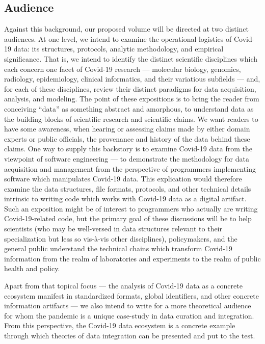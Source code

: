 \documentclass{statsoc}
\newcommand{\p}[1]{

\vspace{.75em}#1}
\newcommand{\textscc}[1]{{\color{orr!35!black}{{%
						\fontfamily{Cabin-TLF}\fontseries{b}\selectfont{\textsc{\scriptsize{#1}}}}}}}
\newcommand{\AcronymText}[1]{{\textscc{#1}}}
\newcommand{\q}[1]{{\fontfamily{qcr}\selectfont ``}#1{\fontfamily{qcr}\selectfont ''}}
\newcommand{\API}{\resizebox{!}{7pt}{\AcronymText{API}}}
\newcommand{\visavis}{vis-\`a-vis}
\begin{document}
\subsection{Audience}
\p{Against this background, our proposed volume 
will be directed at two distinct audiences.  
At one level, we intend to examine the 
operational logistics of Covid-19 data: its 
structures, protocols, analytic methodology, 
and empirical significance.  That is, we 
intend to identify the distinct scientific 
disciplines which each concern one facet 
of Covid-19 research --- molecular biology, 
genomics, radiology, epidemiology, clinical 
informatics, and their variatious subfields 
--- and, for each of these disciplines, 
review their distinct paradigms for 
data acquisition, analysis, and modeling.  
The point of these expositions is to bring 
the reader from conceiving \q{data} as something 
abstract and amorphous, to understand 
data as the building-blocks of scientific 
research and scientific claims.  We 
want readers to have some awareness, when 
hearing or assessing claims made by either 
domain experts or public officials, the 
provenance and history of the data behind these 
claims.  One way to supply this backstory 
is to examine Covid-19 data from the viewpoint 
of software engineering --- to demonstrate 
the methodology for data acquisition and 
management from the perspective of programmers 
implementing software which manipulates Covid-19 data.  
This explication would therefore examine the 
data structures, file formats, \API{} protocols, 
and other technical details intrinsic to writing 
code which works with Covid-19 data as a 
digital artifact.  Such an exposition might be 
of interest to programmers who actually are 
writing Covid-19-related code, but the primary 
goal of these discussions will be to help 
scientists (who may be well-versed in data 
structures relevant to their specialization 
but less so \visavis{} other disciplines), 
policymakers, and the general public understand 
the technical chains which transform 
Covid-19 information from the realm of 
laboratories and experiments to the realm of 
public health and policy.}

\p{Apart from that topical focus --- the analysis 
of Covid-19 data as a concrete ecosystem 
manifest in standardized formats, global 
identifiers, and other concrete information 
artifacts --- we also intend to write for a 
more theoretical audience for whom the 
pandemic is a unique case-study in data 
curation and integration.  From this perspective, 
the Covid-19 data ecosystem is a concrete example 
through which theories of data integration can 
be presented and put to the test.}
\end{document}
